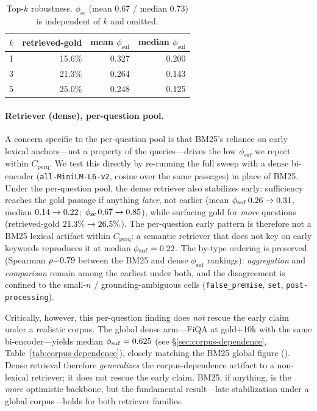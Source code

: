 \begin{table}[t]
\centering
\caption{Top-$k$ robustness. $\phi_{\mathrm{sc}}$ (mean 0.67 / median 0.73) is
independent of $k$ and omitted.}
\label{tab:topk}
\begin{tabular}{lrrr}
\toprule
$k$ & retrieved-gold & mean $\phi_{\mathrm{suf}}$ & median $\phi_{\mathrm{suf}}$ \\
\midrule
1 & 15.6\% & 0.327 & 0.200 \\
3 & 21.3\% & 0.264 & 0.143 \\
5 & 25.0\% & 0.248 & 0.125 \\
\bottomrule
\end{tabular}
\end{table}

\paragraph{Retriever (dense), per-question pool.} A concern specific to the
per-question pool is that BM25's reliance on early lexical anchors---not a
property of the queries---drives the low $\phi_{\mathrm{suf}}$ we report within
$C_{\mathrm{perq}}$.  We test this directly by re-running the full sweep with a
dense bi-encoder (\texttt{all-MiniLM-L6-v2}, cosine over the same passages) in
place of BM25.  Under the per-question pool, the dense retriever also stabilizes
early: sufficiency reaches the gold passage if anything \emph{later}, not earlier
(mean $\phi_{\mathrm{suf}}\,0.26{}\to0.31{}$, median
$0.14{}\to0.22{}$; $\phi_{\mathrm{sc}}\,0.67{}\to0.85{}$),
while surfacing gold for \emph{more} questions (retrieved-gold
$21.3\%{}\to26.5\%{}$).  The per-question early pattern is therefore not
a BM25 lexical artifact within $C_{\mathrm{perq}}$: a semantic retriever that does
not key on early keywords reproduces it at median
$\phi_{\mathrm{suf}}=0.22{}$.  The by-type ordering is preserved
(Spearman $\rho{=}0.79{}$ between the BM25 and dense $\phi_{\mathrm{suf}}$
rankings): \emph{aggregation} and \emph{comparison} remain among the earliest under
both, and the disagreement is confined to the small-$n$ / grounding-ambiguous cells
(\texttt{false\_premise}, \texttt{set}, \texttt{post-processing}).

Critically, however, this per-question finding does \emph{not} rescue the early
claim under a realistic corpus.  The global dense arm---FiQA at gold+10k with the
same bi-encoder---yields median $\phi_{\mathrm{suf}} = 0.625{}$ (see
\S\ref{sec:corpus-dependence}, Table~\ref{tab:corpus-dependence}), closely
matching the BM25 global figure (\phiSufGfiqaBm{}).  Dense retrieval therefore
\emph{generalizes} the corpus-dependence artifact to a non-lexical retriever;
it does not rescue the early claim.  BM25, if anything, is the
\emph{more} optimistic backbone, but the fundamental result---late stabilization
under a global corpus---holds for both retriever families.
